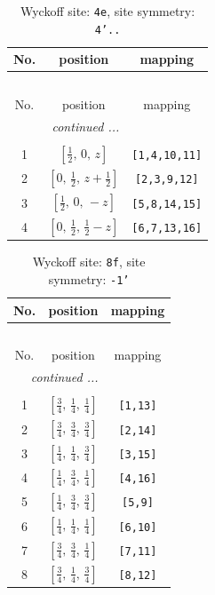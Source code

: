 \documentclass[fleqn,8pt]{jsarticle}
\begin{document}
\renewcommand{\arraystretch}{1.2}
\begin{longtable}{ccc}
\caption{Wyckoff site: {\tt 4e}, site symmetry: {\tt 4'..}}
 \\
 \hline \hline
No. & position & mapping \\ \hline \endfirsthead

\multicolumn{2}{l}{\tablename\ \thetable{}} \\
 \hline \hline
No. & position & mapping \\ \hline \endhead

 \hline \hline
\multicolumn{2}{r}{\footnotesize\it continued ...} \\ \endfoot

 \hline \hline
\multicolumn{2}{r}{} \\ \endlastfoot

1 & $\left[ \frac{1}{2},\, 0,\, z \right]$ & {\tt [1,4,10,11]} \\ \hline
2 & $\left[ 0,\, \frac{1}{2},\, z + \frac{1}{2} \right]$ & {\tt [2,3,9,12]} \\ \hline
3 & $\left[ \frac{1}{2},\, 0,\, - z \right]$ & {\tt [5,8,14,15]} \\ \hline
4 & $\left[ 0,\, \frac{1}{2},\, \frac{1}{2} - z \right]$ & {\tt [6,7,13,16]} \\
\end{longtable}
\renewcommand{\arraystretch}{1.2}
\begin{longtable}{ccc}
\caption{Wyckoff site: {\tt 8f}, site symmetry: {\tt -1'}}
 \\
 \hline \hline
No. & position & mapping \\ \hline \endfirsthead

\multicolumn{2}{l}{\tablename\ \thetable{}} \\
 \hline \hline
No. & position & mapping \\ \hline \endhead

 \hline \hline
\multicolumn{2}{r}{\footnotesize\it continued ...} \\ \endfoot

 \hline \hline
\multicolumn{2}{r}{} \\ \endlastfoot

1 & $\left[ \frac{3}{4},\, \frac{1}{4},\, \frac{1}{4} \right]$ & {\tt [1,13]} \\ \hline
2 & $\left[ \frac{3}{4},\, \frac{3}{4},\, \frac{3}{4} \right]$ & {\tt [2,14]} \\ \hline
3 & $\left[ \frac{1}{4},\, \frac{1}{4},\, \frac{3}{4} \right]$ & {\tt [3,15]} \\ \hline
4 & $\left[ \frac{1}{4},\, \frac{3}{4},\, \frac{1}{4} \right]$ & {\tt [4,16]} \\ \hline
5 & $\left[ \frac{1}{4},\, \frac{3}{4},\, \frac{3}{4} \right]$ & {\tt [5,9]} \\ \hline
6 & $\left[ \frac{1}{4},\, \frac{1}{4},\, \frac{1}{4} \right]$ & {\tt [6,10]} \\ \hline
7 & $\left[ \frac{3}{4},\, \frac{3}{4},\, \frac{1}{4} \right]$ & {\tt [7,11]} \\ \hline
8 & $\left[ \frac{3}{4},\, \frac{1}{4},\, \frac{3}{4} \right]$ & {\tt [8,12]} \\
\end{longtable}
\end{document}
